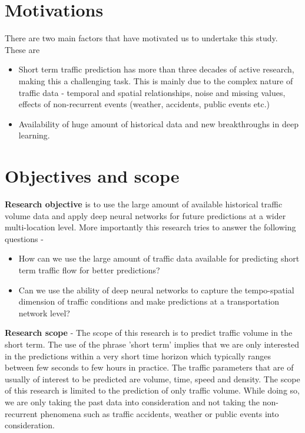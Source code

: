 \section{Motivations}
There are two main factors that have motivated us to undertake this study. These are

\begin{itemize}
\item Short term traffic prediction has more than three decades of active research, making this a
challenging task. This is mainly due to the complex nature of traffic data - temporal and spatial
relationships, noise and missing values, effects of non-recurrent events (weather, accidents,
public events etc.)

\item Availability of huge amount of historical data and new breakthroughs in deep learning.

\end{itemize}

\section{Objectives and scope}

\textbf{Research objective} is to use the large amount of available historical traffic volume data and
apply deep neural networks for future predictions at a wider multi-location level. More importantly this research
tries to answer the following questions -

\begin{itemize}
\item How can we use the large amount of traffic data available for predicting short term traffic
 flow for better predictions?
\item Can we use the ability of deep neural networks to capture the tempo-spatial dimension of
traffic conditions and make predictions at a transportation network level?
\end{itemize}

\textbf{Research scope} - The scope of this research is to predict traffic volume in the
short term. The use of the phrase 'short term' implies that we are only interested in the
predictions within a very short time horizon which typically ranges between few seconds to few
hours in practice. The traffic parameters that are of usually of interest to be predicted are
volume, time, speed and density. The scope of this research is limited to the prediction of only
traffic volume. While doing so, we are only taking the past data into consideration and not
taking the non-recurrent phenomena such as traffic accidents, weather or public events into
consideration.


